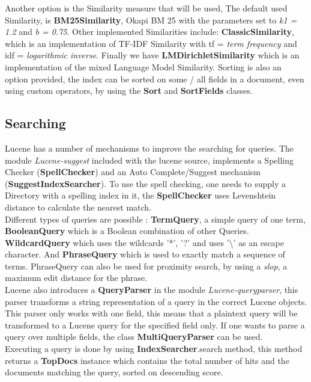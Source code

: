 \documentclass{article}
\begin{document}
Another option is the Similarity measure that will be used, The default used Similarity, is \textbf{BM25Similarity}, Okapi BM 25 with the parameters set to \textit{k1 = 1.2} and \textit{b = 0.75}. Other implemented Similarities include: \textbf{ClassicSimilarity}, which is an implementation of TF-IDF Similarity with tf = \textit{term frequency} and idf = \textit{logarithmic inverse}. Finally we have \textbf{LMDirichletSimilarity} which is an implementation of the mixed Language Model Similarity. Sorting is also an option provided, the index can be sorted on some / all fields in a document, even using custom operators, by using the \textbf{Sort} and \textbf{SortFields} classes.\\

\subsection{Searching}
Lucene has a number of mechanisms to improve the searching for queries. The module \textit{Lucene-suggest} included with the lucene source, implements a Spelling Checker (\textbf{SpellChecker}) and an Auto Complete/Suggest mechanism (\textbf{SuggestIndexSearcher}). To use the spell checking, one needs to supply a Directory with a spelling index in it, the \textbf{SpellChecker} uses Levenshtein distance to calculate the nearest match.\\

Different types of queries are possible : \textbf{TermQuery}, a simple query of one term, \textbf{BooleanQuery} which is a Boolean combination of other Queries. \textbf{WildcardQuery} which uses the wildcards '*', '?' and uses '\textbackslash' as an escape character. And \textbf{PhraseQuery} which is used to exactly match a sequence of terms. PhraseQuery can also be used for proximity search, by using a \textit{slop}, a maximum edit distance for the phrase. \\

Lucene also introduces a \textbf{QueryParser} in the module \textit{Lucene-queryparser}, this parser transforms a string representation of a query in the correct Lucene objects. This parser only works with one field, this means that a plaintext query will be transformed to a Lucene query for the specified field only. If one wants to parse a query over multiple fields, the class \textbf{MultiQueryParser} can be used.\\

Executing a query is done by using \textbf{IndexSearcher}.search method, this method returns a \textbf{TopDocs} instance which contains the total number of hits and the documents matching the query, sorted on descending score.
\end{document}
